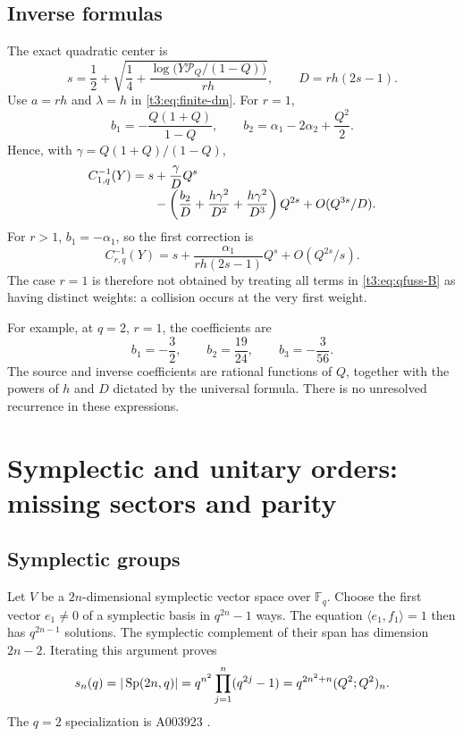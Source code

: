 \documentclass[11pt,openany]{book}
\numberwithin{equation}{chapter}
\theoremstyle{plain}
\theoremstyle{definition}
\theoremstyle{remark}
\newcommand{\F}{\mathbb F}
\newcommand{\Pinf}{\mathcal P_Q}
\begin{document}
\section{Inverse formulas}

The exact quadratic center is
\begin{equation}\label{t3:eq:qfuss-center}
 s=\frac12+\sqrt{\frac14+
       \frac{\log\bigl(Y\Pinf/(1-Q)\bigr)}{rh}},
 \qquad D=rh(2s-1).
\end{equation}
Use $a=rh$ and $\lambda=h$ in \eqref{t3:eq:finite-dm}. For $r=1$,
\begin{equation}\label{t3:eq:qCatalan-b12}
 b_1=-\frac{Q(1+Q)}{1-Q},\qquad
 b_2=\alpha_1-2\alpha_2+\frac{Q^2}{2}.
\end{equation}
Hence, with $\gamma=Q(1+Q)/(1-Q)$,
\begin{align}\label{t3:eq:qCatalan-inverse}
 C_{1,q}^{-1}(Y)=s
 &+\frac{\gamma}{D}Q^s\\[-0.3em]
 &-\left(\frac{b_2}{D}
       +\frac{h\gamma^2}{D^2}
       +\frac{h\gamma^2}{D^3}\right)Q^{2s}
 +O(Q^{3s}/D).\notag
\end{align}
For $r>1$, $b_1=-\alpha_1$, so the first correction is
\begin{equation}\label{t3:eq:qFuss-first}
 C_{r,q}^{-1}(Y)=s+\frac{\alpha_1}{rh(2s-1)}Q^s
                  +O(Q^{2s}/s).
\end{equation}
The case $r=1$ is therefore not obtained by treating all terms in \eqref{t3:eq:qfuss-B} as having distinct weights: a collision occurs at the very first weight.

For example, at $q=2$, $r=1$, the coefficients are
\[
 b_1=-\frac32,\qquad b_2=\frac{19}{24},\qquad
 b_3=-\frac{3}{56}.
\]
The source and inverse coefficients are rational functions of $Q$, together with the powers of $h$ and $D$ dictated by the universal formula. There is no unresolved recurrence in these expressions.

\chapter{Symplectic and unitary orders: missing sectors and parity}
\label{t3:sec:classical}

\section{Symplectic groups}

Let $V$ be a $2n$-dimensional symplectic vector space over $\F_q$. Choose the first vector $e_1\ne0$ of a symplectic basis in $q^{2n}-1$ ways. The equation $\langle e_1,f_1\rangle=1$ then has $q^{2n-1}$ solutions. The symplectic complement of their span has dimension $2n-2$. Iterating this argument proves
\begin{equation}\label{t3:eq:Sp-count}
 s_n(q)=|\operatorname{Sp}(2n,q)|
 =q^{n^2}\prod_{j=1}^n(q^{2j}-1)
 =q^{2n^2+n}(Q^2;Q^2)_n.
\end{equation}
The $q=2$ specialization is A003923 \cite{oeisSp}.
\end{document}
